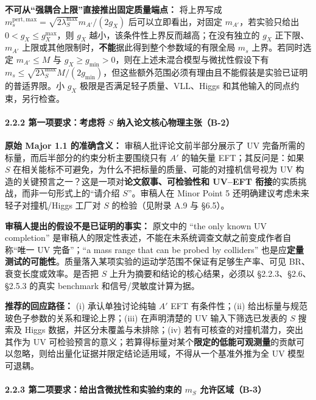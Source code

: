 \documentclass[
]{article}
\begin{document}
\textbf{不可从``强耦合上限''直接推出固定质量端点：} 将上界写成
\(m_s^{\mathrm{pert,max}}=\sqrt{2\lambda_S^{\max}}m_{A'}/(2g_X)\)
后可以立即看出，对固定 \(m_{A'}\)，若实验只给出
\(0<g_X\leq g_X^{\max}\)，则 \(g_X\)
越小，该条件性上界反而越高；在没有独立的 \(g_X\) 正下限、\(m_{A'}\)
上限或其他限制时，\textbf{不能}据此得到整个参数域的有限全局 \(m_s\)
上界。若同时选定 \(m_{A'}\leq M\) 与
\(g_X\geq g_{\min}>0\)，则在上述未混合模型与微扰性假设下有
\(m_s\leq\sqrt{2\lambda_S^{\max}}M/(2g_{\min})\)，但这些额外范围必须有理由且不能假装是实验已证明的普适界限。小
\(g_X\) 极限是否满足轻子质量、VLL、Higgs
和其他输入的同点约束，另行检查。

\paragraph{\texorpdfstring{2.2.2 第一项要求：考虑将 \(S\)
纳入论文核心物理主张（B-2）}{2.2.2 第一项要求：考虑将 S 纳入论文核心物理主张（B-2）}}\label{ux7b2cux4e00ux9879ux8981ux6c42ux8003ux8651ux5c06-s-ux7eb3ux5165ux8bbaux6587ux6838ux5fc3ux7269ux7406ux4e3bux5f20b-2}

\textbf{原始 Major 1.1 的准确含义：} 审稿人批评论文前半部分展示了 UV
完备所需的标量，而后半部分的约束分析主要围绕只有 \(A'\) 的轴矢量
EFT；其反问是：如果 \(S\)
在相关能标不可避免，为什么不把标量的质量、可能的对撞机信号视为 UV
构造的关键预言之一？这是一项对\textbf{论文叙事、可检验性和 UV--EFT
衔接}的实质挑战，而非一句形式上的``请介绍 \(S\)''。审稿人在 Minor Point
5 还明确建议考虑未来轻子对撞机/Higgs 工厂对 \(S\) 的检验（见附录 A.9 与
§6.5）。

\textbf{审稿人提出的假设不是已证明的事实：} 原文中的 ``the only known UV
completion''
是审稿人的限定性表述，不能在未系统调查文献之前变成作者自称``唯一 UV
完备''；``a mass range that can be probed by colliders''
也是应\textbf{定量测试的可能性}。质量落入某项实验的运动学范围不保证有足够生产率、可见
BR、衰变长度或效率。是否把 \(S\) 上升为摘要和结论的核心结果，必须以
§2.2.3、§2.6、§2.5.3 的真实 benchmark 和信号/灵敏度计算为据。

\textbf{推荐的回应路径：} (i) 承认单独讨论纯轴 \(A'\) EFT 有条件性；(ii)
给出标量与规范玻色子参数的关系和理论上界；(iii) 在声明清楚的 UV
输入下筛选已发表的 \(S\) 搜索及 Higgs 数据，并区分未覆盖与未排除；(iv)
若有可核查的对撞机潜力，突出其作为 UV
可检验预言的意义；若算得标量对某个\textbf{限定的低能可观测量}的贡献可以忽略，则给出量化证据并限定结论适用域，不得从一个基准外推为全
UV 模型可退耦。

\paragraph{\texorpdfstring{2.2.3 第二项要求：给出含微扰性和实验约束的
\(m_S\)
允许区域（B-3）}{2.2.3 第二项要求：给出含微扰性和实验约束的 m\_S 允许区域（B-3）}}\label{ux7b2cux4e8cux9879ux8981ux6c42ux7ed9ux51faux542bux5faeux6270ux6027ux548cux5b9eux9a8cux7ea6ux675fux7684-m_s-ux5141ux8bb8ux533aux57dfb-3}
\end{document}
